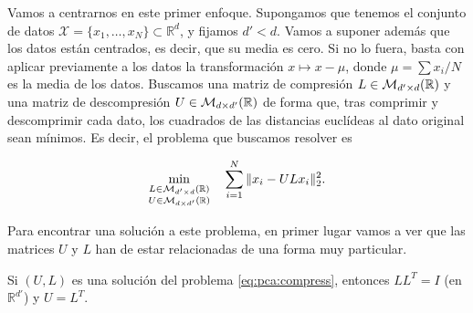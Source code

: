 \documentclass{book}
\begin{document}
Vamos a centrarnos en este primer enfoque. Supongamos que tenemos el conjunto de datos $\mathcal{X} = \{x_1,\dots,x_N\} \subset \mathbb{R}^d$, y fijamos $d' < d$. Vamos a suponer además que los datos están centrados, es decir, que su media es cero. Si no lo fuera, basta con aplicar previamente a los datos la transformación $x \mapsto x - \mu$, donde $\mu = \sum x_i / N$ es la media de los datos. Buscamos una matriz de compresión $L \in \mathcal{M}_{d'\times d}(\mathbb{R})$ y una matriz de descompresión $U \in \mathcal{M}_{d\times d'}(\mathbb{R})$ de forma que, tras comprimir y descomprimir cada dato, los cuadrados de las distancias euclídeas al dato original sean mínimos. Es decir, el problema que buscamos resolver es

\begin{equation} \label{eq:pca:compress}
	\min_{\substack{L \in \mathcal{M}_{d'\times d}(\mathbb{R}) \\ U \in \mathcal{M}_{d\times d'}(\mathbb{R})}} \quad \sum_{i=1}^{N} \|x_i - ULx_i\|_2^2.
\end{equation}

Para encontrar una solución a este problema, en primer lugar vamos a ver que las matrices $U$ y $L$ han de estar relacionadas de una forma muy particular.

\begin{lem}
	Si $(U,L)$ es una solución del problema \ref{eq:pca:compress}, entonces $LL^T = I$ (en $\mathbb{R}^{d'}$) y $U = L^T$.
\end{lem}
\end{document}
